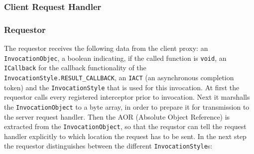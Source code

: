 \subsubsection{Client Request Handler}

\subsubsection{Requestor}
The requestor receives the following data from the client proxy: an \texttt{InvocationObjec}, a boolean indicating, if the called function is \texttt{void}, an \texttt{ICallback} for the callback functionality of the \texttt{InvocationStyle.RESULT\_CALLBACK}, an \texttt{IACT} (an asynchronous completion token) and the \texttt{InvocationStyle} that is used for this invocation. At first the requestor calls every registered interceptor prior to invocation. Next it marshalls the \texttt{InvocationObject} to a byte array, in order to prepare it for transmission to the server request handler. Then the AOR (Absolute Object Reference) is extracted from the \texttt{InvocationObject}, so that the requstor can tell the request handler explicitly to which location the request has to be sent. In the next step the requestor distinguishes between the different \texttt{InvocationStyle}s:
